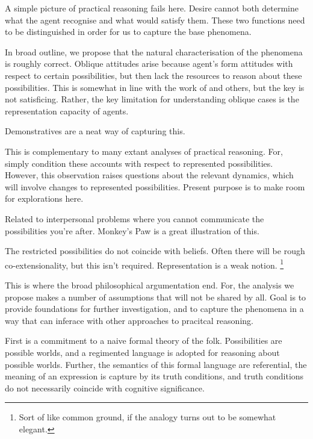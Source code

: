 \documentclass[10pt]{article}
\begin{document}
A simple picture of practical reasoning fails here.
Desire cannot both determine what the agent recognise and what would satisfy them.
These two functions need to be distinguished in order for us to capture the base phenomena.

In broad outline, we propose that the natural characterisation of the phenomena is roughly correct.
Oblique attitudes arise because agent's form attitudes with respect to certain possibilities, but then lack the resources to reason about these possibilities.
This is somewhat in line with the work of \citeauthor{Simon:1997aa} and others, but the key is not satisficing.
Rather, the key limitation for understanding oblique cases is the representation capacity of agents.

Demonstratives are a neat way of capturing this.

This is complementary to many extant analyses of practical reasoning.
For, simply condition these accounts with respect to represented possibilities.
However, this observation raises questions about the relevant dynamics, which will involve changes to represented possibilities.
Present purpose is to make room for explorations here.

Related to interpersonal problems where you cannot communicate the possibilities you're after.
Monkey's Paw is a great illustration of this.

The restricted possibilities do not coincide with beliefs.
Often there will be rough co-extensionality, but this isn't required.
Representation is a weak notion.\nolinebreak
\footnote{Sort of like common ground, if the analogy turns out to be somewhat elegant.}


This is where the broad philosophical argumentation end.
For, the analysis we propose makes a number of assumptions that will not be shared by all.
Goal is to provide foundations for further investigation, and to capture the phenomena in a way that can inferace with other approaches to pracitcal reasoning.

First is a commitment to a naive formal theory of the folk.
Possibilities are possible worlds, and a regimented language is adopted for reasoning about possible worlds.
Further, the semantics of this formal language are referential, the meaning of an expression is capture by its truth conditions, and truth conditions do not necessarily coincide with cognitive significance.
\end{document}
